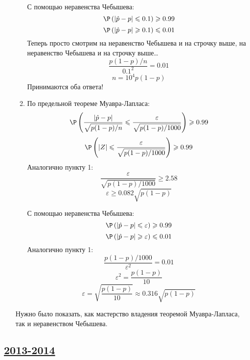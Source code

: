 \begin{enumerate}
\begin{enumerate}
С помощью неравенства Чебышева:
\[ \P \left( |\hat{p} - p| \leqslant 0.1 \right) \geqslant 0.99 \]
\[ \P \left( |\hat{p} - p| \geqslant 0.1 \right) \leqslant 0.01 \]
Теперь просто смотрим на неравенство Чебышева и на строчку выше, на неравенство Чебышева и на строчку выше\ldots
\[ \frac{p(1-p)/n}{0.1^2} = 0.01\]
\[ n = 10^4 p(1-p) \]
Принимаются оба ответа!

\item По предельной теореме Муавра-Лапласа:
\[ \P \left( \frac{|\hat{p} - p|}{\sqrt{p(1-p)/n}} \leqslant \frac{\varepsilon}{\sqrt{p(1-p)/1000}} \right) \geqslant 0.99 \]
\[ \P \left( |Z| \leqslant \frac{\varepsilon}{\sqrt{p(1-p)/1000}} \right) \geqslant 0.99 \]
Аналогично пункту 1:
\[ \frac{\varepsilon}{\sqrt{p(1-p)/1000}} \geqslant 2.58 \]
\[ \varepsilon \geqslant 0.082 \sqrt{p(1-p)} \]

С помощью неравенства Чебышева:
\[ \P \left( |\hat{p} - p| \leqslant \varepsilon \right) \geqslant 0.99 \]
\[ \P \left( |\hat{p} - p| \geqslant \varepsilon \right) \leqslant 0.01 \]
Аналогично пункту 1:
\[ \frac{p(1-p)/1000}{\varepsilon^2} = 0.01\]
\[ \varepsilon^2 = \frac{p(1-p)}{10} \]
\[ \varepsilon = \sqrt{\frac{p(1-p)}{10}} \approx 0.316 \sqrt{p(1-p)} \]

\end{enumerate}

Нужно было показать, как мастерство владения теоремой Муавра-Лапласа, так и неравенством Чебышева.

\end{enumerate}




\subsection[2013-2014]{\hyperref[sec:kr_02_2013_2014]{2013-2014}}
\label{sec:sol_kr_02_2013_2014}


